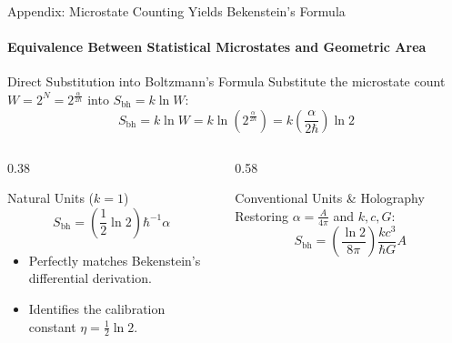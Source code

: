 \documentclass[aspectratio=169]{beamer}
\begin{document}
\begin{frame}{Appendix: Microstate Counting Yields Bekenstein's Formula}
\framesubtitle{Equivalence Between Statistical Microstates and Geometric Area}

\begin{block}{Direct Substitution into Boltzmann's Formula}
Substitute the microstate count $W = 2^N = 2^{\frac{\alpha}{2\hbar}}$ into $S_{\text{bh}} = k \ln W$:
\[
  S_{\text{bh}} = k \ln W = k \ln\left(2^{\frac{\alpha}{2\hbar}}\right) = k \left(\frac{\alpha}{2\hbar}\right) \ln 2
\]
\end{block}

\vspace{-0.3cm}

\begin{columns}[T]
  \begin{column}{0.38\textwidth}
    \begin{block}{Natural Units ($k=1$)}
    \[
      \boxed{S_{\text{bh}} = \left(\frac{1}{2} \ln 2\right) \hbar^{-1} \alpha}
    \]
    \vspace{-0.5cm}
    \begin{itemize}
      \item Perfectly matches Bekenstein's differential derivation.
      \item Identifies the calibration constant $\eta = \frac{1}{2}\ln 2$.
    \end{itemize}
    \end{block}
  \end{column}

  \begin{column}{0.58\textwidth}
    \begin{block}{Conventional Units \& Holography}
    Restoring $\alpha = \frac{A}{4\pi}$ and $k, c, G$:
    \vspace{-0.3cm}
    \[
      S_{\text{bh}} = \left(\frac{\ln 2}{8\pi}\right) \frac{k c^3}{\hbar G} A
    \]
    \vspace{-0.4cm}
    \begin{itemize}
    \end{itemize}
    \end{block}
  \end{column}
\end{columns}
\end{frame}
\end{document}
